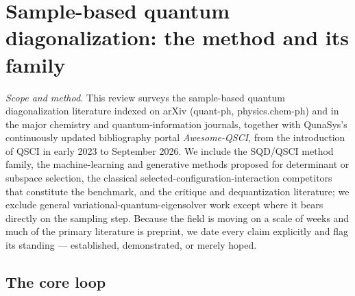 \documentclass[onecolumn,a4paper]{quantumarticle}
\begin{document}
\section{Sample-based quantum diagonalization: the method and its family}\label{sec:2}

\emph{Scope and method.} This review surveys the sample-based quantum diagonalization literature indexed on arXiv (quant-ph, physics.chem-ph) and in the major chemistry and quantum-information journals, together with QunaSys's continuously updated bibliography portal \emph{Awesome-QSCI}, from the introduction of QSCI in early 2023 to September 2026. We include the SQD/QSCI method family, the machine-learning and generative methods proposed for determinant or subspace selection, the classical selected-configuration-interaction competitors that constitute the benchmark, and the critique and dequantization literature; we exclude general variational-quantum-eigensolver work except where it bears directly on the sampling step. Because the field is moving on a scale of weeks and much of the primary literature is preprint, we date every claim explicitly and flag its standing --- established, demonstrated, or merely hoped.


\subsection{The core loop}\label{sec:2-1}
\end{document}
